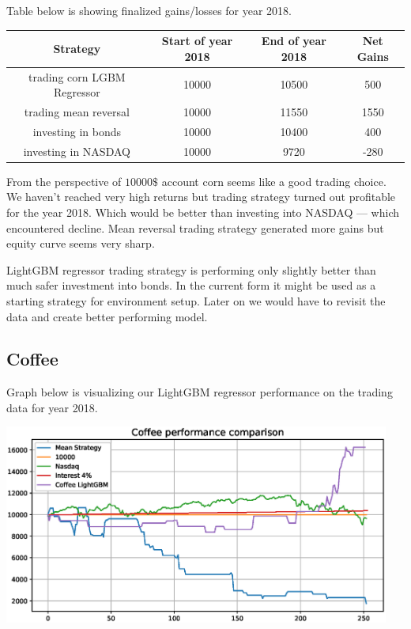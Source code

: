 \documentclass[final,2p]{elsarticle}
\begin{document}
Table below is showing finalized gains/losses for year 2018.

\begin{center}
    \begin{tabular}{cccc}
        Strategy & Start of year 2018 & End of year 2018 & Net Gains \\
        \hline
        trading corn LGBM Regressor & 10000 & 10500 & 500 \\
        trading mean reversal & 10000 & 11550 & 1550 \\
        investing in bonds & 10000 & 10400 & 400 \\
        investing in NASDAQ & 10000 & 9720 & -280 \\
    \end{tabular}
\end{center}

From the perspective of $10000\$$ account corn seems like a good trading choice. We haven't reached
very high returns but trading strategy turned out profitable for the year 2018. Which would be
better than investing into NASDAQ --- which encountered decline. Mean reversal trading strategy generated
more gains but equity curve seems very sharp.

LightGBM regressor trading strategy is performing only slightly better than much safer investment
into bonds. In the current form it might be used as a starting strategy for environment setup.
Later on we would have to revisit the data and create better performing model.

\subsection{Coffee}

Graph below is visualizing our LightGBM regressor performance on the trading data for year 2018.

\begin{center}
\includegraphics[width = 5in]{figures/coffee_benchmark_performance.eps}
\end{center}
\end{document}
